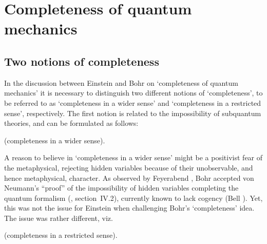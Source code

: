\documentclass[12pt]{article}
\begin{document}
\section{Completeness of quantum mechanics}\label{sec2.1}
\subsection{Two notions of completeness}\label{sec2.1.1}
In the discussion between Einstein and Bohr on `completeness of
quantum mechanics' it is necessary to distinguish two different
notions of `completeness', to be referred to as `completeness in a
wider sense' and `completeness in a restricted sense',
respectively. The first notion is related to the impossibility of
subquantum theories, and can be formulated as follows:

 (completeness in a wider sense).

A reason to believe in `completeness in a wider sense' might be a
positivist fear of the metaphysical, rejecting hidden variables
because of their unobservable, and hence metaphysical, character.
As observed by Feyerabend \cite{Feyerabend68}, Bohr accepted von
Neumann's ``proof'' of the impossibility of hidden variables
completing the quantum formalism (\cite{vN32}, section~IV.2),
currently known to lack cogency (Bell \cite{Bell66}). Yet, this
was not the issue for Einstein when challenging Bohr's
`completeness' idea. The issue was rather different, viz.

\medskip
{}
(completeness in a restricted sense).
\medskip
\end{document}
